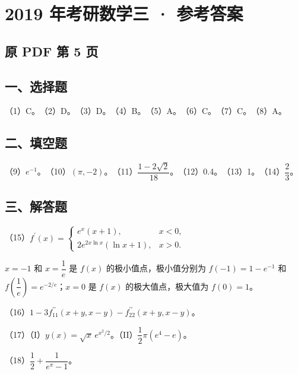 \documentclass[UTF8,12pt]{ctexart}
\begin{document}
\section*{2019 年考研数学三 · 参考答案}
\subsection*{原 PDF 第 5 页}

\subsection*{一、选择题}

（1）C。　（2）D。　（3）D。　（4）B。　（5）A。　（6）C。　（7）C。　（8）A。


\subsection*{二、填空题}

（9）\(\displaystyle e^{-1}\)。　（10）\(\displaystyle (\pi,\allowbreak -2)\)。　（11）\(\displaystyle \dfrac{\displaystyle 1-2\sqrt2}{\displaystyle 18}\)。　（12）0.4。　（13）1。　（14）\(\displaystyle \dfrac{\displaystyle 2}{\displaystyle 3}\)。


\subsection*{三、解答题}

（15）\(\displaystyle f^\prime(x)=\begin{cases}e^x(x+1),\allowbreak &x<0,\allowbreak \\2e^{2x\ln x}(\ln x+1),\allowbreak &x>0.\end{cases}\)


\(\displaystyle x=-1\) 和 \(\displaystyle x=\dfrac{\displaystyle 1}{\displaystyle e}\) 是 \(\displaystyle f(x)\) 的极小值点，极小值分别为 \(\displaystyle f(-1)=1-e^{-1}\) 和 \(\displaystyle f(\dfrac{\displaystyle 1}{\displaystyle e})=e^{-2/e}\)；\(\displaystyle x=0\) 是 \(\displaystyle f(x)\) 的极大值点，极大值为 \(\displaystyle f(0)=1\)。


（16）\(\displaystyle 1-3f_{11}^{\prime\prime}(x+y,\allowbreak x-y)-f_{22}^{\prime\prime}(x+y,\allowbreak x-y)\)。


（17）（I）\(\displaystyle y(x)=\sqrt x\,e^{x^2/2}\)。（II）\(\displaystyle \dfrac{\displaystyle 1}{\displaystyle 2}\pi(e^4-e)\)。


（18）\(\displaystyle \dfrac{\displaystyle 1}{\displaystyle 2}+\dfrac{\displaystyle 1}{\displaystyle e^\pi-1}\)。
\end{document}
